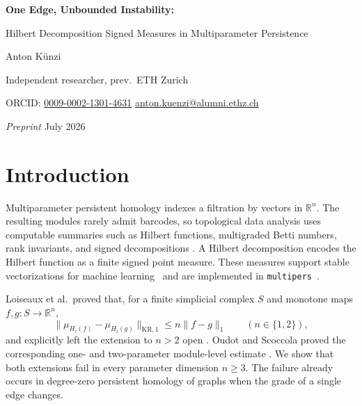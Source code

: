 \documentclass[11pt]{article}
\makeatletter
\theoremstyle{definition}
\newcommand{\R}{\mathbb{R}}
\newcommand{\1}{\mathbf{1}}
\newcommand{\KR}{\mathrm{KR}}
\newcommand{\papertitlelead}{One Edge, Unbounded Instability:}
\newcommand{\papertitlesub}{Hilbert Decomposition Signed Measures in Multiparameter Persistence}
\newcommand{\makepapermodernfrontmatter}{%
  \vspace*{-2.2em}
  \noindent
  \begin{minipage}{\textwidth}
    \sffamily
    \textcolor{softgray}{\small\bfseries PREPRINT}
    \hfill\textcolor{softgray}{\small 30 July 2026}\par
    \vspace{0.7em}
    \textcolor{sourceblue}{\rule{\textwidth}{1.2pt}}\par
    \vspace{0.75em}
    {\fontsize{23}{27}\selectfont\bfseries\color{darkink}\papertitlelead\par}
    \vspace{0.2em}
    {\Large\color{darkink}\papertitlesub\par}
    \vspace{0.85em}
    {\large\bfseries\color{darkink}Anton Künzi\par}
    \vspace{0.35em}
    {\small\color{darkink}Independent researcher, prev.\ ETH Zurich\par}
    {\small
     ORCID: \href{https://orcid.org/0009-0002-1301-4631}{0009-0002-1301-4631}
     \enspace\textcolor{softgray}{/}\enspace
     \href{mailto:anton.kuenzi@alumni.ethz.ch}{anton.kuenzi@alumni.ethz.ch}\par}
    \vspace{0.6em}
    \textcolor{softgray!45}{\rule{\textwidth}{0.5pt}}
  \end{minipage}
  \vspace{0.6em}
}
\newcommand{\makepapertraditionalfrontmatter}{%
  \vspace*{-1.5em}
  \begin{center}
    {\LARGE\bfseries\papertitlelead\par}
    \vspace{0.25em}
    {\Large\papertitlesub\par}
    \vspace{1.05em}
    \paperauthorblock
    \vspace{0.55em}
    {\small\textit{Preprint}
     \enspace\textperiodcentered\enspace 30 July 2026\par}
  \end{center}
  \paperauthornote
  \vspace{0.8em}
}
\newcommand{\paperauthorblock}{%
    {\large Anton Künzi\par}
    \vspace{0.35em}
    {\small Independent researcher, prev.\ ETH Zurich\par}
    {\small
     ORCID: \href{https://orcid.org/0009-0002-1301-4631}{0009-0002-1301-4631}
     \enspace\textperiodcentered\enspace
     \href{mailto:anton.kuenzi@alumni.ethz.ch}{anton.kuenzi@alumni.ethz.ch}\par}
  }
\newcommand{\paperauthornote}{}
\newcommand{\makepaperfrontmatter}{\makepapertraditionalfrontmatter}
\newcommand{\paperauthorblock}{{\large Anton Künzi\footnotemark\par}}
\newcommand{\paperauthornote}{%
      \footnotetext{Independent researcher, prev.\ ETH Zurich. ORCID:
      \href{https://orcid.org/0009-0002-1301-4631}{0009-0002-1301-4631}.
      \href{mailto:anton.kuenzi@alumni.ethz.ch}{anton.kuenzi@alumni.ethz.ch}.}
    }
\newcommand{\makepaperfrontmatter}{\makepapertraditionalfrontmatter}
\newcommand{\makepaperfrontmatter}{\makepapermodernfrontmatter}
\makeatother
\begin{document}
\makepaperfrontmatter

\begin{abstract}
We prove that Hilbert decomposition signed measures, a computable summary of
multiparameter persistent homology, are not uniformly stable over all finite
filtrations once there are at least three parameters.  For every $n\geq3$ and
$m\geq1$, we construct two filtrations of the same finite graph that differ
only in the grade of one edge, yet
\[
  \lVert f_m-g_m\rVert_1=1,\qquad
  \bigl\lVert\mu_{H_0(f_m)}-\mu_{H_0(g_m)}\bigr\rVert_{\KR,1}=2m.
\]
The output distance is therefore unbounded at fixed input distance one.  This
settles an open question of Loiseaux et al.~\cite{LoiseauxEtAl2023} and gives a
\hyperref[cor:phase]{sharp dimensional cutoff}: the dimension-only estimate
holds for one and two parameters, but no finite dimension-only constant exists
for $n\geq3$.
Rescaling puts every grade in the unit cube with input distance $1/m$ and
output distance two, ruling out a graph-independent modulus of continuity.
The four-vertex diamond graph is the smallest violation; after subdivision,
the same mechanism occurs in lower-star filtrations.  The corresponding
module-level bound also fails.  The counterexample family and its main
quantitative consequences are
\hyperref[app:lean]{formalized and kernel-checked in Lean}.
\end{abstract}

\section{Introduction}

Multiparameter persistent homology indexes a filtration by vectors in
$\R^n$.  The resulting modules rarely admit barcodes, so topological data
analysis uses computable summaries such as Hilbert functions, multigraded
Betti numbers, rank invariants, and signed decompositions
\cite{BotnanLesnick2023,BotnanOppermannOudot2025}.  A Hilbert decomposition
encodes the Hilbert function as a finite signed point measure.  These measures
support stable vectorizations for machine learning~\cite{LoiseauxEtAl2023}
and are implemented in \texttt{multipers}~\cite{LoiseauxSchreiber2024}.

Loiseaux et al.\ proved that, for a finite simplicial complex $S$ and
monotone maps $f,g:S\to\R^n$,
\begin{equation}\label{eq:known-positive}
  \bigl\lVert\mu_{H_i(f)}-\mu_{H_i(g)}\bigr\rVert_{\KR,1}
  \leq n\lVert f-g\rVert_1
  \qquad(n\in\{1,2\}),
\end{equation}
and explicitly left the extension to $n>2$ open
\cite[Theorem~1(1)]{LoiseauxEtAl2023}.  Oudot and Scoccola proved the
corresponding one- and two-parameter module-level estimate
\cite[Theorem~1.5]{OudotScoccola2024}.  We show that both extensions fail in
every parameter dimension $n\geq3$.  The failure already occurs in degree-zero
persistent homology of graphs when the grade of a single edge changes.
\end{document}
